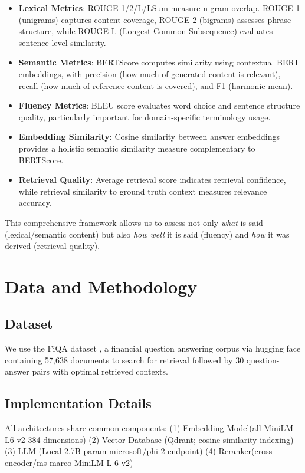 \documentclass[11pt]{article}
\begin{document}
\begin{itemize}
    \item \textbf{Lexical Metrics}: ROUGE-1/2/L/LSum \citep{lin2004rouge} measure 
    n-gram overlap. ROUGE-1 (unigrams) captures content coverage, ROUGE-2 
    (bigrams) assesses phrase structure, while ROUGE-L (Longest Common Subsequence) 
    evaluates sentence-level similarity.
    
    \item \textbf{Semantic Metrics}: BERTScore \citep{zhang2019bertscore} computes 
    similarity using contextual BERT embeddings, with precision (how much of 
    generated content is relevant), recall (how much of reference content is 
    covered), and F1 (harmonic mean).
    
    \item \textbf{Fluency Metrics}: BLEU score \citep{papineni2002bleu} evaluates 
    word choice and sentence structure quality, particularly important for 
    domain-specific terminology usage.
    
    \item \textbf{Embedding Similarity}: Cosine similarity between answer 
    embeddings provides a holistic semantic similarity measure complementary 
    to BERTScore.
    
    \item \textbf{Retrieval Quality}: Average retrieval score indicates 
    retrieval confidence, while retrieval similarity to ground truth context 
    measures relevance accuracy.
\end{itemize}

This comprehensive framework allows us to assess not only \textit{what} is said 
(lexical/semantic content) but also \textit{how well} it is said (fluency) and 
\textit{how} it was derived (retrieval quality).

\section{Data and Methodology}

\subsection{Dataset}
We use the FiQA dataset \citep{maia2018fiqa}, a financial question answering 
corpus via hugging face containing 57,638 documents to search for retrieval 
followed by 30 question-answer pairs with optimal retrieved contexts. 

\subsection{Implementation Details}
All architectures share common components: (1) Embedding Model(all-MiniLM-L6-v2 
384 dimensions) (2) Vector Database (Qdrant; cosine similarity indexing) (3) LLM
(Local 2.7B param microsoft/phi-2 endpoint) (4) Reranker(cross-encoder/ms-marco-MiniLM-L-6-v2)
\end{document}
